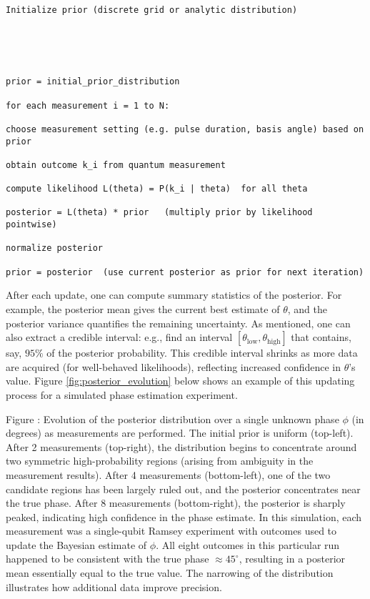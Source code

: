 \begin{verbatim}





Initialize prior (discrete grid or analytic distribution)





prior = initial_prior_distribution

for each measurement i = 1 to N:

choose measurement setting (e.g. pulse duration, basis angle) based on prior

obtain outcome k_i from quantum measurement

compute likelihood L(theta) = P(k_i | theta)  for all theta

posterior = L(theta) * prior   (multiply prior by likelihood pointwise)

normalize posterior

prior = posterior  (use current posterior as prior for next iteration)

\end{verbatim}



After each update, one can compute summary statistics of the
posterior. For example, the posterior mean gives the current best
estimate of $\theta$, and the posterior variance quantifies the
remaining uncertainty. As mentioned, one can also extract a credible
interval: e.g., find an interval $[\theta_{\text{low}},
  \theta_{\text{high}}]$ that contains, say, $95\%$ of the posterior
probability. This credible interval shrinks as more data are acquired
(for well-behaved likelihoods), reflecting increased confidence in
$\theta$’s value. Figure \ref{fig:posterior_evolution} below shows an
example of this updating process for a simulated phase estimation
experiment.



Figure \label{fig:posterior_evolution}: Evolution of the posterior
distribution over a single unknown phase $\phi$ (in degrees) as
measurements are performed. The initial prior is uniform
(top-left). After 2 measurements (top-right), the distribution begins
to concentrate around two symmetric high-probability regions (arising
from ambiguity in the measurement results). After 4 measurements
(bottom-left), one of the two candidate regions has been largely ruled
out, and the posterior concentrates near the true phase. After 8
measurements (bottom-right), the posterior is sharply peaked,
indicating high confidence in the phase estimate. In this simulation,
each measurement was a single-qubit Ramsey experiment with outcomes
used to update the Bayesian estimate of $\phi$. All eight outcomes in
this particular run happened to be consistent with the true phase
$\approx 45^\circ$, resulting in a posterior mean essentially equal to
the true value. The narrowing of the distribution illustrates how
additional data improve precision.



